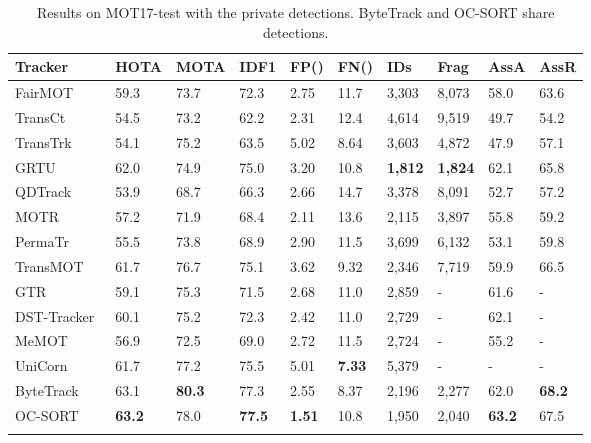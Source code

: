\documentclass[10pt,twocolumn,letterpaper]{article}
\newcommand*{\aboverulesepcolor}[1]{\noalign{\begingroup 
      \color{#1}\hrule height\aboverulesep 
    \endgroup 
    \kern-\aboverulesep 
  }}
\begin{document}
\begin{table*}[hbt!]
\centering
\caption{Results on MOT17-test with the private detections. ByteTrack and OC-SORT share detections.}
\setlength{\tabcolsep}{7pt}
\scriptsize
\begin{tabular}{ l | p{20px}p{20px}p{20px}p{27px} p{27px}p{22px}p{22px}p{20px}p{20px}}
\toprule
Tracker &  HOTA & MOTA & IDF1 &  FP({\footnotesize }) & FN({\footnotesize }) & IDs & Frag & AssA & AssR \\
\midrule
FairMOT~\cite{zhang2021fairmot} & 59.3 & 73.7 & 72.3  & 2.75 & 11.7 & 3,303 & 8,073 & 58.0 & 63.6\\
TransCt~\cite{transcenter} & 54.5 & 73.2 & 62.2  & 2.31 & 12.4 & 4,614 & 9,519 & 49.7 & 54.2 \\
TransTrk~\cite{sun2020transtrack} & 54.1 & 75.2 & 63.5  & 5.02 & 8.64 & 3,603 & 4,872 & 47.9 & 57.1 \\
GRTU~\cite{grtu} & 62.0 & 74.9 & 75.0  & 3.20 & 10.8 & \textbf{1,812} & \textbf{1,824} & 62.1 & 65.8\\ 
QDTrack~\cite{pang2021quasi} & 53.9 & 68.7 & 66.3  & 2.66 & 14.7 & 3,378 & 8,091 & 52.7 & 57.2\\
MOTR~\cite{zeng2022motr} & 57.2 &71.9 & 68.4 & 2.11 & 13.6 & 2,115 & 3,897 & 55.8 & 59.2  \\
PermaTr~\cite{permatrack} & 55.5 & 73.8 & 68.9 & 2.90 & 11.5 & 3,699 & 6,132 & 53.1 & 59.8 \\
TransMOT~\cite{chu2021transmot} & 61.7 & 76.7 & 75.1 & 3.62 & 9.32 & 2,346 & 7,719 & 59.9 & 66.5 \\
GTR~\cite{zhou2022global} & 59.1 & 75.3 & 71.5 & 2.68 & 11.0 & 2,859 & - & 61.6 & -\\ 
DST-Tracker~\cite{dsttrack} & 60.1 & 75.2 & 72.3 & 2.42 & 11.0 & 2,729 & - & 62.1 & - \\ 
MeMOT~\cite{cai2022memot} & 56.9 & 72.5 & 69.0 & 2.72 & 11.5 & 2,724 & - & 55.2 & -\\ 
UniCorn~\cite{yan2022unicorn} & 61.7 & 77.2 & 75.5 & 5.01 & \textbf{7.33} & 5,379 & - & - & -\\ 
\rowcolor{babyblue!20}ByteTrack~\cite{bytetrack} & 63.1 & \textbf{80.3} & 77.3 & 2.55 &  8.37 & 2,196 & 2,277 & 62.0 & \textbf{68.2}\\
\rowcolor{babyblue!20}OC-SORT & \textbf{63.2} & 78.0 & \textbf{77.5} & \textbf{1.51} & 10.8 & 1,950 & 2,040 & \textbf{63.2} & 67.5\\
\aboverulesepcolor{babyblue!20}
\bottomrule
\end{tabular}
\label{table:mot17}
\end{table*}
\end{document}
